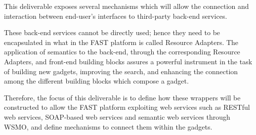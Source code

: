 \documentclass{fast_latex}
\begin{document}
This deliverable exposes several mechanisms which will allow the connection and interaction between end-user's interfaces to third-party back-end services.

These back-end services cannot be directly used; hence they need to be encapsulated in what in the FAST platform is called Resource Adapters. The application of semantics to the back-end, through the corresponding Resource Adapters, and front-end building blocks assures a powerful instrument in the task of building new gadgets, improving the search, and enhancing the connection among the different building blocks which compose a gadget.

Therefore, the focus of this deliverable is to define how these wrappers will be constructed to allow the FAST platform exploiting web services \cite{GustavoAlonso2003} such as RESTful web services, SOAP-based web services and semantic web services through WSMO, and define mechanisms to connect them within the gadgets.

\newpage


\clearpage
\end{document}
